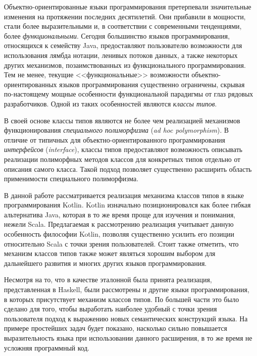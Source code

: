 \intro

Объектно-ориентированные языки программирования претерпевали значительные изменения на протяжении последних десятилетий. Они прибавили в мощности, стали более выразительными и, в соответствии с современными тенденциями, более \emph{функциональными}. Сегодня большинство языков программирования, относящихся к семейству Java, предоставляют пользователю возможности для использования лямбда нотации, ленивых потоков данных, а также некоторых других механизмов, позаимствованных из функционального программирования. Тем не менее, текущие <<функциональные>> возможности объектно-ориентированных языков программирования существенно ограничены, скрывая по-настоящему мощные особенности функциональной парадигмы от глаз рядовых разработчиков. Одной из таких особенностей являются \emph{классы типов}.

В своей основе классы типов являются не более чем реализацией механизмов функционирования \emph{специального полиморфизма} (\emph{ad hoc polymorphism}). В отличие от типичных для объектно-ориентированного программирования \emph{интерфейсов} (\emph{interface}), классы типов предоставляют возможность описывать реализации полиморфных методов классов для конкретных типов отдельно от описания самого класса. Такой подход позволяет существенно расширить область применимости специального полиморфизма. 

В данной работе рассматривается реализация механизма классов типов в языке программирования Kotlin. 
Kotlin изначально позиционировался как более гибкая альтернатива Java, которая в то же время проще для изучения и понимания, нежели Scala. Предлагаемая к рассмотрению реализация учитывает данную особенность философии Kotlin, позволяя существенно усилить его позиции относительно Scala с точки зрения пользователей. Стоит также отметить, что механизм классов типов также может являться хорошим выбором для дальнейшего развития и многих других языков программирования.

Несмотря на то, что в качестве эталонной была принята реализация, представленная в Haskell, были рассмотрены и другие языки программирования, в которых присутствует механизм классов типов. По большей части это было сделано для того, чтобы выработать наиболее удобный с точки зрения пользователя подход к выражению новых семантических конструкций языка. На примере простейших задач будет показано, насколько сильно повышается выразительность языка при использовании данного расширения, в то же время не усложняя программный код.